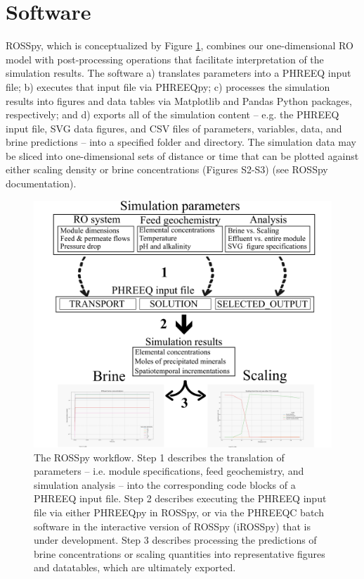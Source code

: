 \section{Software}
ROSSpy, which is conceptualized by Figure \ref{workflow}, combines our one-dimensional RO model with post-processing operations that facilitate interpretation of the simulation results. The software a) translates parameters into a PHREEQ input file; b) executes that input file via PHREEQpy; c) processes the simulation results into figures and data tables via Matplotlib \cite{Hunter2007Matplotlib:Environment} and Pandas \cite{McKinney2011Pandas:Statistics} Python packages, respectively; and d) exports all of the simulation content -- e.g. the PHREEQ input file, SVG data figures, and CSV files of parameters, variables, data, and brine predictions -- into a specified folder and directory. The simulation data may be sliced into one-dimensional sets of distance or time that can be plotted against either scaling density or brine concentrations (Figures S2-S3) (see ROSSpy documentation).


\begin{figure}
    \centering
    \includegraphics[width = \linewidth]{images/ROSSpy/rosspy_workflow_1.PNG}
    \caption{
        The ROSSpy workflow. Step 1 describes the translation of parameters -- i.e. module specifications, feed geochemistry, and simulation analysis -- into the corresponding code blocks of a PHREEQ input file. Step 2 describes executing the PHREEQ input file via either PHREEQpy in ROSSpy, or via the PHREEQC batch software in the interactive version of ROSSpy (iROSSpy) that is under development. Step 3 describes processing the predictions of brine concentrations or scaling quantities into representative figures and datatables, which are ultimately exported.
    }
    \label{workflow}
\end{figure}

